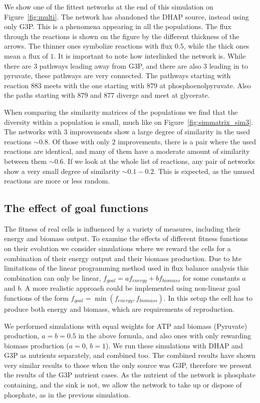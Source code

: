 \documentclass[a4paper,12pt]{article}
\begin{document}
We show one of the fittest networks at the end of this simulation on Figure~\ref{fig:multi}. The network has abandoned the DHAP source, instead using only G3P. This is a phenomena appearing in all the populations. The flux through the reactions is shown on the figure by the different thickness of the arrows. The thinner ones symbolize reactions with flux $0.5$, while the thick ones mean a flux of $1$. It is important to note how interlinked the network is.  While there are 3 pathways leading away from G3P, and there are also $3$ leading in to pyruvate, these pathways are very connected. The pathways starting with reaction $883$ meets with the one starting with $879$ at phosphoenolpyruvate. Also the paths starting with $879$ and $877$  diverge and meet at glycerate. 

When comparing the similarity matrices of the populations we find that the diversity within a population is small, much like on Figure~\ref{fig:simmatrix_sim3}. The networks with $3$ improvements show a large degree of similarity in the used reactions $\sim 0.8$. Of those with only $2$ improvements, there is a pair where the used reactions are identical, and many of them have a moderate amount of similarity between them $\sim 0.6$. If we look at the whole list of reactions, any pair of networks show a very small degree of similarity $\sim 0.1-0.2$. This is expected, as the unused reactions are more or less random. 

\subsection{The effect of goal functions}
\label{sub:goalfuncs}

The fitness of real cells is influenced by a variety of measures, including their energy and biomass output. To examine the effects of different fitness functions on their evolution we consider simulations where we reward the cells for a combination of their energy output and their biomass production. Due to hte limitations of the linear programming method used in flux balance analysis this combination can only be linear, $f_{goal}=a f_{energy}+ b f_{biomass}$ for some constants $a$ and $b$. A more realistic approach could be implemented using non-linear goal functions of the form $f_{goal}=\min \left( f_{energy},f_{biomass} \right)$. In this setup the cell has to produce both energy and biomass, which are requirements of reproduction.

We performed simulations with equal weights for ATP and biomass (Pyruvate) production, $a=b=0.5$ in the above formula, and also ones with only rewarding biomass production ($a=0$, $b=1$). We run these simulations with DHAP and G3P as nutrients separately, and combined too. The combined results have shown very similar results to those when the only source was G3P, therefore we present the results of the G3P nutrient cases. As the nutrient of the network is phosphate containing, and the sink is not, we allow the network to take up or dispose of phosphate, as in the previous simulation. 
\end{document}
